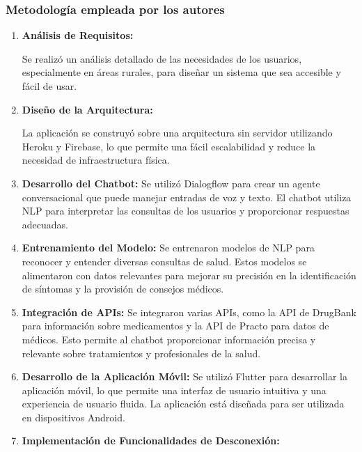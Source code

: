 	\subsubsection{Metodología empleada por los autores}
	
		\begin{enumerate}
		
		\item \textbf{Análisis de Requisitos:}
		
			\subitem Se realizó un análisis detallado de las necesidades de los usuarios, especialmente en áreas rurales, para diseñar un sistema que sea accesible y fácil de usar.
		
		\item \textbf{Diseño de la Arquitectura:}
		
			\subitem La aplicación se construyó sobre una arquitectura sin servidor utilizando Heroku y Firebase, lo que permite una fácil escalabilidad y reduce la necesidad de infraestructura física.
		
		\item \textbf{Desarrollo del Chatbot:}
			\subitem Se utilizó Dialogflow para crear un agente conversacional que puede manejar entradas de voz y texto. El chatbot utiliza NLP para interpretar las consultas de los usuarios y proporcionar respuestas adecuadas.
	
		\item \textbf{Entrenamiento del Modelo:}
			\subitem Se entrenaron modelos de NLP para reconocer y entender diversas consultas de salud. Estos modelos se alimentaron con datos relevantes para mejorar su precisión en la identificación de síntomas y la provisión de consejos médicos.
			
		\item \textbf{Integración de APIs:}
			\subitem Se integraron varias APIs, como la API de DrugBank para información sobre medicamentos y la API de Practo para datos de médicos. Esto permite al chatbot proporcionar información precisa y relevante sobre tratamientos y profesionales de la salud.
	
		\item \textbf{Desarrollo de la Aplicación Móvil:}
			\subitem Se utilizó Flutter para desarrollar la aplicación móvil, lo que permite una interfaz de usuario intuitiva y una experiencia de usuario fluida. La aplicación está diseñada para ser utilizada en dispositivos Android.
		
		\item \textbf{Implementación de Funcionalidades de Desconexión:}
	

\end{enumerate}
